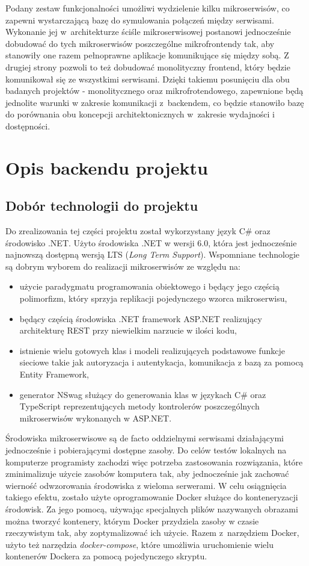 \documentclass{SGGW-thesis}
\begin{document}
Podany zestaw funkcjonalności umożliwi wydzielenie kilku mikroserwisów, co zapewni wystarczającą bazę do symulowania połączeń między serwisami. Wykonanie jej w~architekturze ściśle mikroserwisowej postanowi jednocześnie dobudować do tych mikroserwisów poszczególne mikrofrontendy tak, aby stanowiły one razem pełnoprawne aplikacje komunikujące się między sobą. Z drugiej strony pozwoli to też dobudować monolityczny frontend, który będzie komunikował się ze wszystkimi serwisami. Dzięki takiemu posunięciu dla obu badanych projektów - monolitycznego oraz mikrofrotendowego, zapewnione będą jednolite warunki w zakresie komunikacji z~backendem, co będzie stanowiło bazę do porównania obu koncepcji architektonicznych w~zakresie wydajności i dostępności.

\chapter{Opis backendu projektu}
  \section{Dobór technologii do projektu}
  Do zrealizowania tej części projektu został wykorzystany język C\# oraz środowisko .NET. Użyto środowiska .NET w wersji 6.0, która jest jednocześnie najnowszą dostępną wersją LTS (\textit{Long Term Support}). Wspomniane technologie są dobrym wyborem do realizacji mikroserwisów ze względu na:
  
  \begin{itemize}
    \item użycie paradygmatu programowania obiektowego i będący jego częścią polimorfizm, który sprzyja replikacji pojedynczego wzorca mikroserwisu,
    \item będący częścią środowiska .NET framework ASP.NET realizujący architekturę REST przy niewielkim narzucie w ilości kodu,
    \item istnienie wielu gotowych klas i modeli realizujących podstawowe funkcje sieciowe takie jak autoryzacja i autentykacja, komunikacja z bazą za pomocą Entity Framework,
    \item generator NSwag służący do generowania klas w językach C\# oraz TypeScript reprezentujących metody kontrolerów poszczególnych mikroserwisów wykonanych w ASP.NET.
  \end{itemize}

  Środowiska mikroserwisowe są de facto oddzielnymi serwisami działającymi jednocześnie i pobierającymi dostępne zasoby. Do celów testów lokalnych na komputerze programisty zachodzi więc potrzeba zastosowania rozwiązania, które zminimalizuje użycie zasobów komputera tak, aby jednocześnie jak zachować wierność odwzorowania środowiska z wieloma serwerami. W celu osiągnięcia takiego efektu, zostało użyte oprogramowanie Docker służące do konteneryzacji środowisk. Za jego pomocą, używając specjalnych plików nazywanych obrazami można tworzyć kontenery, którym Docker przydziela zasoby w czasie rzeczywistym tak, aby zoptymalizować ich użycie. 
  Razem z~narzędziem Docker, użyto też narzędzia \textit{docker-compose}, które umożliwia uruchomienie wielu kontenerów Dockera za pomocą pojedynczego skryptu.
\end{document}
